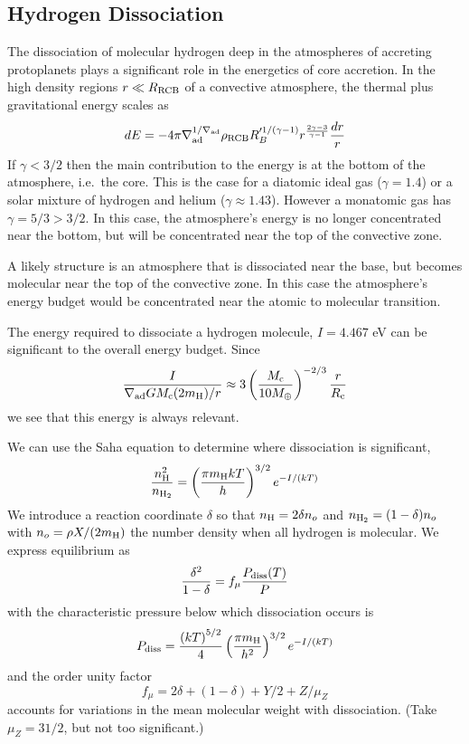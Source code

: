 \documentclass[apj]{emulateapj}
\newcommand{\co}{_{\rm c}}
\newcommand{\cb}{_{\rm RCB}}
\begin{document}
\subsection{Hydrogen Dissociation}
The dissociation of molecular hydrogen deep in the atmospheres of accreting protoplanets plays a significant role in the energetics of core accretion.  In the high density regions $r  \ll R\cb$ of a convective atmosphere, the thermal plus gravitational energy scales as
\begin{equation}
dE = -4 \pi \nabla_{\rm ad}^{1/\nabla_{\rm ad}} \rho\cb R_B'^{1/(\gamma-1)} r^{\frac{2\gamma - 3}{\gamma - 1}} {dr \over r}
\end{equation} 
If $\gamma < 3/2$ then the main contribution to the energy is at the bottom of the atmosphere, i.e.\ the core.  This is the case for a diatomic ideal gas ($\gamma = 1.4$) or a solar mixture of hydrogen and helium ($\gamma \approx 1.43$).  However a monatomic gas has $\gamma = 5/3 > 3/2$.  In this case, the atmosphere's energy is no longer concentrated near the bottom, but will be concentrated near the top of the convective zone.

A likely structure is an atmosphere that is dissociated near the base, but becomes molecular near the top of the convective zone.  In this case the atmosphere's energy budget would be concentrated near the atomic to molecular transition.

The energy required to dissociate a hydrogen molecule, $I = 4.467$ eV can be significant to the overall energy budget.
Since
\begin{equation}
{I \over \nabla_{\rm ad} G M\co (2 m_{\rm H})/r} \approx 3 \left(M\co \over 10 M_\oplus \right)^{-2/3} {r \over R_{\rm c}}
\end{equation} 
we see that this energy is always relevant.

We can use the Saha equation to determine where dissociation is significant,
\begin{equation}
{n_{\rm H}^2 \over n_{\rm H_2}} = \left(\pi m_{\rm H} k T \over h \right)^{3/2} e^{-I/(kT)}
\end{equation} 
We introduce a reaction coordinate $\delta$ so that $n_{\rm H} = 2 \delta n_o$ and $n_{\rm H_2} = (1-\delta) n_o$ with $n_o = \rho X/(2 m_{\rm H})$ the number density when all hydrogen is molecular.  We express equilibrium as
\begin{equation}
{\delta^2 \over 1-\delta} = f_\mu {P_{\rm diss}(T) \over P}
\end{equation} 
with the characteristic pressure below which dissociation occurs is
\begin{equation}
P_{\rm diss} = {\left(kT\right)^{5/2} \over 4} \left( \pi m_{\rm H} \over h^2\right)^{3/2}  e^{-I/(kT)}
\end{equation} 
and the order unity factor
\begin{equation}
f_\mu = 2\delta + (1-\delta) + Y/2 + Z/\mu_Z
\end{equation} 
accounts for variations in the mean molecular weight with dissociation.  (Take $\mu_Z = 31/2$, but not too significant.)
\end{document}
